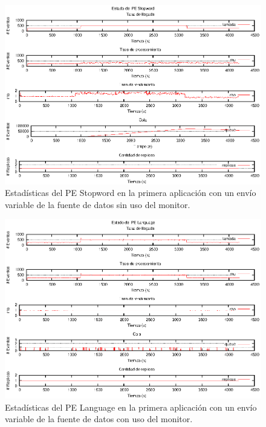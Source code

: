 \begin{figure}[p]
\centering
    \includegraphics[scale=1.1]{images/exp/app1/normal/sm/statusStopwordPE.eps}
    \caption{Estadísticas del PE Stopword en la primera aplicación con un envío variable de la fuente de datos sin uso del monitor.}
    \label{fig:app1-normal-statusStopwordPE-sm}
\end{figure}

\begin{figure}[p]
\centering
    \includegraphics[scale=1.1]{images/exp/app1/normal/cm/statusLanguagePE.eps}
    \caption{Estadísticas del PE Language en la primera aplicación con un envío variable de la fuente de datos con uso del monitor.}
    \label{fig:app1-normal-statusLanguagePE-cm}
\end{figure}

